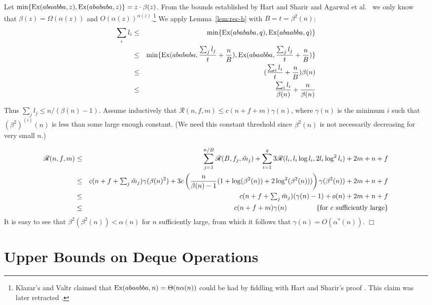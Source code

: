 \documentclass{article}
\newenvironment{proof}{\noindent {\bf Proof:}}{\hfill$\Box$}
\newcommand{\hcm}[1][1]{\hspace*{#1 cm}}
\newcommand{\paren}[1]{\left( #1 \right)}
\newcommand{\Ex}{\mbox{\rm Ex}}
\newcommand{\mdown}{\tilde{m}}
\newcommand{\Rec}{\mathscr{R}}
\begin{document}
\begin{proof}
Let $\min\{\Ex(abaabba,z), \Ex(abababa, z)\} = z\cdot \beta(z)$.  
From the bounds established by Hart and Sharir \cite{HS86}
and Agarwal et al.~\cite{ASS89} we only know that $\beta(z) = \Omega(\alpha(z))$ and $O(\alpha(z))^{\alpha(z)}$.\footnote{Klazar's 
and Valtr \cite{KV94} claimed that $\Ex(abaabba,n) = \Theta(n\alpha(n))$ could be had by fiddling with Hart and Sharir's proof \cite{HS86}.
This claim was later retracted \cite{Klazar02}.}
We apply Lemma~\ref{lem:rec-b} with
$B = t = \beta^2(n)$:
\begin{eqnarray*}
\sum_i l_i &\le& \min\{\Ex(abababa, q), \Ex(abaabba,q)\}\\
               &\le&  \min\{\Ex(abababa, \frac{\sum_j l_j}{t} + \frac{n}{B}), \Ex(abaabba,\frac{\sum_j l_j}{t} + \frac{n}{B})\}\\
               &\le& (\frac{\sum_i l_i}{t} + \frac{n}{B})\beta(n)\\
               &\le& \frac{\sum_i l_i}{\beta(n)} + \frac{n}{\beta(n)}
\end{eqnarray*}

Thus $\sum_j l_j \le n/(\beta(n)-1)$.  Assume inductively that $\Rec(n,f,m) \le c(n+f+m)\gamma(n)$, where 
$\gamma(n)$ is the minimum $i$ such that $(\beta^2)^{(i)}(n)$ is less than some large enough constant.  (We need 
this constant threshold since $\beta^2(n)$ is not necessarily decreasing for very small $n$.)

\begin{eqnarray*}
\Rec(n,f,m) &\le& \sum_{j=1}^{n/B} \Rec(B,f_j,\mdown_j) + \sum_{i=1}^{q} 3\Rec(l_i, l_i\log l_i, 2l_i\log^2 l_i) + 2m + n + f\\
                 &\le& c(n+f+\mbox{$\sum_j \mdown_j$})\gamma(\beta(n)^2) + 3c\paren{\frac{n}{\beta(n)-1}(1+\log(\beta^2(n)) + 2\log^2(\beta^2(n)))}\gamma(\beta^2(n)) + 2m + n+f\\
                 &\le& c(n+f+\mbox{$\sum_j \mdown_j$})(\gamma(n)-1) + o(n) + 2m + n+f\\
                 &\le& c(n+f+m)\gamma(n) \hcm[1.5]\{\mbox{for $c$ sufficiently large}\}\\
\end{eqnarray*}
It is easy to see that $\beta^2(\beta^2(n)) < \alpha(n)$ for $n$ sufficiently large, from which it follows that
$\gamma(n) = O(\alpha^*(n))$.
\end{proof}

\section{Upper Bounds on Deque Operations}\label{sect:deque}
\end{document}
